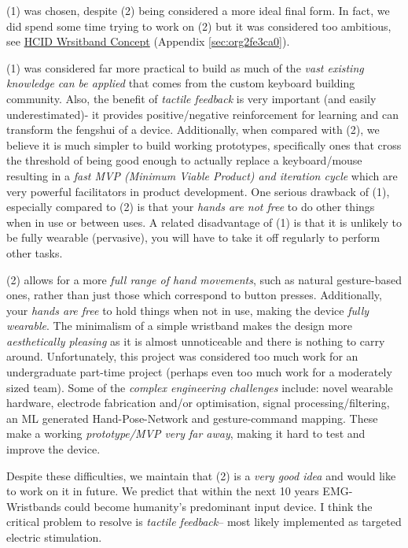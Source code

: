 \documentclass[logo,bsc,singlespacing,parskip]{infthesis}
\begin{document}
(1) was chosen, despite (2) being considered a more ideal final form.
In fact, we did spend some time trying to work on (2) but it was considered too ambitious, see \hyperref[sec:org2fe3ca0]{HCID Wrsitband Concept} (Appendix \ref{sec:org2fe3ca0}).

(1) was considered far more practical to build as much of the \emph{vast existing knowledge can be applied} that comes from the custom keyboard building community.
Also, the benefit of \emph{tactile feedback} is very important (and easily underestimated)- it provides positive/negative reinforcement for learning and can transform the fengshui of a device.
Additionally, when compared with (2), we believe it is much simpler to build working prototypes, specifically ones that cross the threshold of being good enough to actually replace a keyboard/mouse resulting in a \emph{fast MVP (Minimum Viable Product) and iteration cycle} which are very powerful facilitators in product development.
One serious drawback of (1), especially compared to (2) is that your \emph{hands are not free} to do other things when in use or between uses. A related disadvantage of (1) is that it is unlikely to be fully wearable (pervasive), you will have to take it off regularly to perform other tasks.

(2) allows for a more \emph{full range of hand movements}, such as natural gesture-based ones, rather than just those which correspond to button presses.
Additionally, your \emph{hands are free} to hold things when not in use, making the device \emph{fully wearable}.
The minimalism of a simple wristband makes the design more \emph{aesthetically pleasing} as it is almost unnoticeable and there is nothing to carry around.
Unfortunately, this project was considered too much work for an undergraduate part-time project (perhaps even too much work for a moderately sized team).
Some of the \emph{complex engineering challenges} include: novel wearable hardware, electrode fabrication and/or optimisation, signal processing/filtering, an ML generated Hand-Pose-Network and gesture-command mapping.
These make a working \emph{prototype/MVP very far away}, making it hard to test and improve the device.

Despite these difficulties, we maintain that (2) is a \emph{very good idea} and would like to work on it in future.
We predict that within the next 10 years EMG-Wristbands could become humanity's predominant input device. I think the critical problem to resolve is \emph{tactile feedback}-- most likely implemented as targeted electric stimulation.
\end{document}

